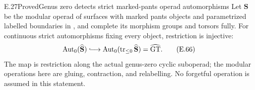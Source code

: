 \begin{result}{E.27}{Proved}{Genus zero detects strict marked-pants operad automorphisms}
Let $\mathbf S$ be the modular operad of surfaces
with marked pants objects and parametrized labelled
boundaries in \cite[Definitions 3.1--3.3]{ET_BonattoRobertson2026},
and complete its morphism groups and torsors fully.
For continuous strict automorphisms fixing every
object, restriction is injective:
\[
 \operatorname{Aut}_0(\widehat{\mathbf S})
   \lhook\joinrel\longrightarrow
 \operatorname{Aut}_0(\operatorname{tr}_{\leq0}
                     \widehat{\mathbf S})
   =\widehat{\operatorname{GT}}.                          \tag{E.66}
\]
The map is restriction along the actual genus-zero
cyclic suboperad; the modular operations here are
gluing, contraction, and relabelling.  No
forgetful operation is assumed in this statement.
\end{result}
